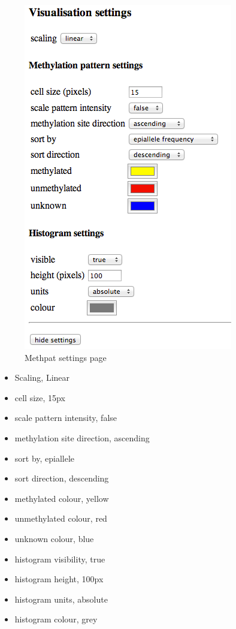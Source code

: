 \documentclass[11pt,a4paper]{article}
\begin{document}
\begin{figure}[H] %
   \centering
   \includegraphics[scale=0.65]{images/methpat002.png} 
   \caption{Methpat settings page}
   \label{fig:methpat2}
\end{figure}

\begin{itemize}
\item{Scaling, Linear}
\item{cell size, 15px}
\item{scale pattern intensity, false}
\item{methylation site direction, ascending}
\item{sort by, epiallele}
\item{sort direction, descending}
\item{methylated colour, yellow}
\item{unmethylated colour, red}
\item{unknown colour, blue}
\item{histogram visibility, true}
\item{histogram height, 100px}
\item{histogram units, absolute}
\item{histogram colour, grey}
\end{itemize}
\end{document}
